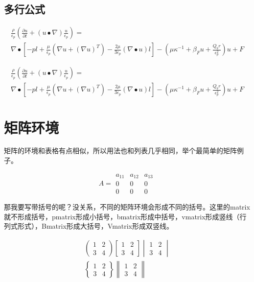 \subsection{多行公式}

\begin{latex}
\begin{multline}
\frac{\rho}{\epsilon_p} \left(\frac{\partial u}{\partial t}+(u \bullet \nabla)\frac{u}{\epsilon_p}\right)=\\
\nabla \bullet \left[ -pl+\frac{\mu}{\epsilon_p}\left( \nabla u+(\nabla u)^T\right)-\frac{2\mu}{3\epsilon_p}(\nabla \bullet u)l\right]-\left( \mu \kappa^{-1} + \beta_{F}u+ \frac{Q_br}{\epsilon^{2}_{p}} \right)u+F
\end{multline}
\end{latex}

\begin{multline}
\frac{\rho}{\epsilon_p} \left(\frac{\partial u}{\partial t}+(u \bullet \nabla)\frac{u}{\epsilon_p}\right)=\\
\nabla \bullet \left[ -pl+\frac{\mu}{\epsilon_p}\left( \nabla u+(\nabla u)^T\right)-\frac{2\mu}{3\epsilon_p}(\nabla \bullet u)l\right]-\left( \mu \kappa^{-1} + \beta_{F}u+ \frac{Q_br}{\epsilon^{2}_{p}} \right)u+F
\end{multline}

\section{矩阵环境}
矩阵的环境和表格有点相似，所以用法也和列表几乎相同，举个最简单的矩阵例子。
\begin{codeshow}
\[
A=\begin{matrix}
a_{11} & a_{12} & a_{13}\\
0 & 0 & 0\\
0 & 0 & 0
\end{matrix}
\]
\end{codeshow}

那我要写带括号的呢？没关系，不同的矩阵环境会形成不同的括号。这里的matrix就不形成括号，pmatrix形成小括号，bmatrix形成中括号，vmatrix形成竖线（行列式形式），Bmatrix形成大括号，Vmatrix形成双竖线。
\begin{codeshow}
\begin{gather*}
	\begin{pmatrix}1 & 2\\
	3 & 4\end{pmatrix}
	\begin{bmatrix}1 & 2\\
	3 & 4\end{bmatrix}
	\begin{vmatrix}1 & 2\\
	3 & 4\end{vmatrix}\\
	\begin{Bmatrix}1 & 2\\
	3 & 4\end{Bmatrix}
	\begin{Vmatrix}1 & 2\\
	3 & 4\end{Vmatrix}
\end{gather*}
\end{codeshow}

